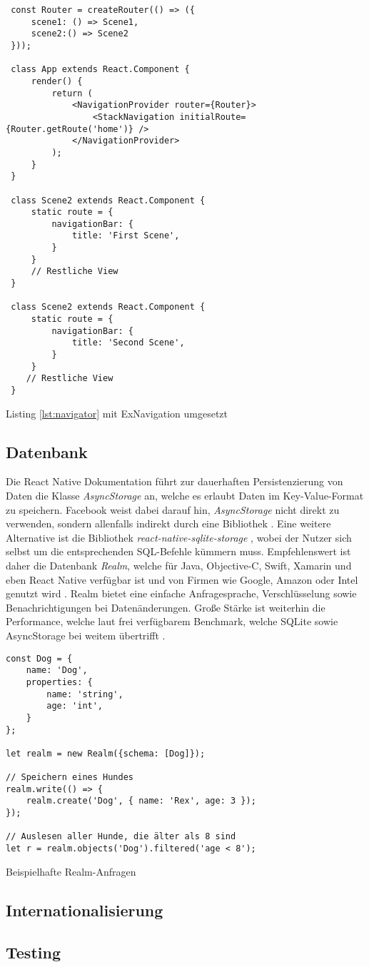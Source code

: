 \begin{listing}[H]
    \begin{verbatim}
 const Router = createRouter(() => ({
     scene1: () => Scene1,
     scene2:() => Scene2
 }));
 
 class App extends React.Component {
     render() {
         return (
             <NavigationProvider router={Router}>
                 <StackNavigation initialRoute={Router.getRoute('home')} />
             </NavigationProvider>
         );
     }
 }
 
 class Scene2 extends React.Component {
     static route = {
         navigationBar: {
             title: 'First Scene',
         }
     }
     // Restliche View
 }
 
 class Scene2 extends React.Component {
     static route = {
         navigationBar: {
             title: 'Second Scene',
         }
     }
    // Restliche View
 }
    \end{verbatim}
    \caption{Listing \ref{lst:navigator} mit ExNavigation umgesetzt}
    \label{lst:ex_navigation}
\end{listing}

\subsection{Datenbank}
Die React Native Dokumentation führt zur dauerhaften Persistenzierung von Daten die Klasse \textit{AsyncStorage} an, welche es erlaubt Daten im Key-Value-Format zu speichern. Facebook weist dabei darauf hin, \textit{AsyncStorage} nicht direkt zu verwenden, sondern allenfalls indirekt durch eine Bibliothek \cite{AsyncStorage_2017}. Eine weitere Alternative ist die Bibliothek \textit{react-native-sqlite-storage} \cite{react-native-sqlite-storage_2016}, wobei der Nutzer sich selbst um die entsprechenden SQL-Befehle kümmern muss. Empfehlenswert ist daher die Datenbank \textit{Realm}, welche für Java, Objective-C, Swift, Xamarin und eben React Native verfügbar ist und von Firmen wie Google, Amazon oder Intel genutzt wird \cite{Realm_2016}. Realm bietet eine einfache Anfragesprache, Verschlüsselung sowie Benachrichtigungen bei Datenänderungen. Große Stärke ist weiterhin die Performance, welche laut frei verfügbarem Benchmark, welche SQLite sowie AsyncStorage bei weitem übertrifft \cite{Introducing_Realm_React_Native_2016}. 

\begin{listing}[H]
    \begin{verbatim}
const Dog = {
    name: 'Dog',
    properties: {
        name: 'string',
        age: 'int',
    }
};

let realm = new Realm({schema: [Dog]});

// Speichern eines Hundes
realm.write(() => {
    realm.create('Dog', { name: 'Rex', age: 3 });
});

// Auslesen aller Hunde, die älter als 8 sind
let r = realm.objects('Dog').filtered('age < 8');
    \end{verbatim}
    \caption{Beispielhafte Realm-Anfragen}
    \label{lst:realm}
\end{listing}

\subsection{Internationalisierung}

\subsection{Testing}